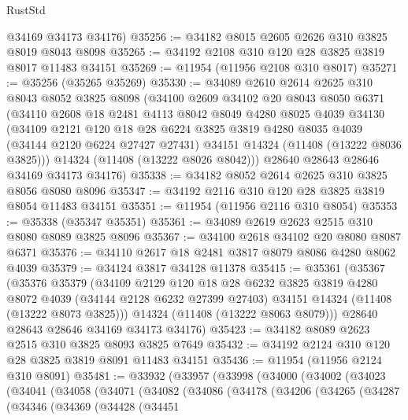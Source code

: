 \begin{lexlean}{RustStd}
\begin{coremodule}
      @34169
      @34173
      @34176)
@35256 := @34182 @8015 @2605 @2626 @310 @3825 @8019 @8043 @8098
@35265 := @34192 @2108 @310 @120 @28 @3825 @3819 @8017 @11483 @34151
@35269 := @11954 (@11956 @2108 @310 @8017)
@35271 := @35256 (@35265 @35269)
@35330 := @34089
    @2610
    @2614
    @2625
    @310
    @8043
    @8052
    @3825
    @8098
    (@34100
      @2609
      @34102
      @20
      @8043
      @8050
      @6371
      (@34110
        @2608
        @18
        @2481
        @4113
        @8042
        @8049
        @4280
        @8025
        @4039
        @34130
        (@34109
          @2121
          @120
          @18
          @28
          @6224
          @3825
          @3819
          @4280
          @8035
          @4039
          (@34144 @2120 @6224 @27427 @27431)
          @34151
          @14324
          (@11408 (@13222 @8036 @3825)))
        @14324
        (@11408 (@13222 @8026 @8042)))
      @28640
      @28643
      @28646
      @34169
      @34173
      @34176)
@35338 := @34182 @8052 @2614 @2625 @310 @3825 @8056 @8080 @8096
@35347 := @34192 @2116 @310 @120 @28 @3825 @3819 @8054 @11483 @34151
@35351 := @11954 (@11956 @2116 @310 @8054)
@35353 := @35338 (@35347 @35351)
@35361 := @34089 @2619 @2623 @2515 @310 @8080 @8089 @3825 @8096
@35367 := @34100 @2618 @34102 @20 @8080 @8087 @6371
@35376 := @34110 @2617 @18 @2481 @3817 @8079 @8086 @4280 @8062 @4039
@35379 := @34124 @3817 @34128 @11378
@35415 := @35361
    (@35367
      (@35376
        @35379
        (@34109
          @2129
          @120
          @18
          @28
          @6232
          @3825
          @3819
          @4280
          @8072
          @4039
          (@34144 @2128 @6232 @27399 @27403)
          @34151
          @14324
          (@11408 (@13222 @8073 @3825)))
        @14324
        (@11408 (@13222 @8063 @8079)))
      @28640
      @28643
      @28646
      @34169
      @34173
      @34176)
@35423 := @34182 @8089 @2623 @2515 @310 @3825 @8093 @3825 @7649
@35432 := @34192 @2124 @310 @120 @28 @3825 @3819 @8091 @11483 @34151
@35436 := @11954 (@11956 @2124 @310 @8091)
@35481 := @33932
    (@33957
      (@33998
        (@34000
          (@34002
            (@34023
              (@34041
                (@34058
                  (@34071
                    (@34082
                      (@34086
                        (@34178
                          (@34206
                            (@34265
                              (@34287
                                (@34346
                                  (@34369
                                    (@34428
                                      (@34451

\end{coremodule}
\end{lexlean}
